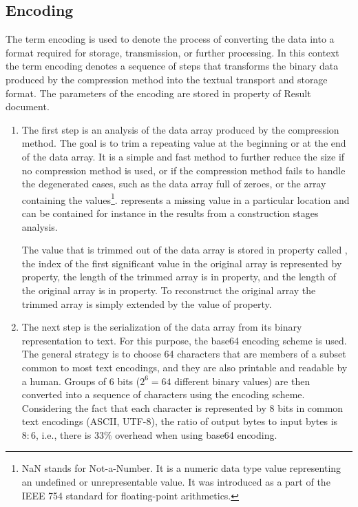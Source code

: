 \subsection {Encoding}
\label{subsec:encoding}

The term encoding is used to denote the process of converting the data into a format required for storage, transmission, or further processing. In this context the term encoding denotes a sequence of steps that transforms the binary data produced by the compression method into the textual transport and storage format. The parameters of the encoding are stored in  property of Result document.

\begin{enumerate}
    
    \item The first step is an analysis of the data array produced by the compression method. The goal is to trim a repeating value at the beginning or at the end of the data array. It is a simple and fast method to further reduce the size if no compression method is used, or if the compression method fails to handle the degenerated cases, such as the data array full of zeroes, or the array containing the  values\footnote{NaN stands for Not-a-Number. It is a numeric data type value representing an undefined or unrepresentable value. It was introduced as a part of the IEEE 754 standard for floating-point arithmetics.}.  represents a missing value in a particular location and can be contained for instance in the results from a construction stages analysis.

    The value that is trimmed out of the data array is stored in property called , the index of the first significant value in the original array is represented by  property, the length of the trimmed array is in  property, and the length of the original array is in  property. To reconstruct the original array the trimmed array is simply extended by the value of  property.
    
    \item The next step is the serialization of the data array from its binary representation to text. For this purpose, the base64 encoding scheme is used. The general strategy is to choose 64 characters that are members of a subset common to most text encodings, and they are also printable and readable by a human. Groups of 6 bits ($2^6 = 64$ different binary values) are then converted into a sequence of characters using the encoding scheme. Considering the fact that each character is represented by 8 bits in common text encodings (ASCII, UTF-8), the ratio of output bytes to input bytes is $8:6$, i.e., there is $33\%$ overhead when using base64 encoding.
    

\end{enumerate}
